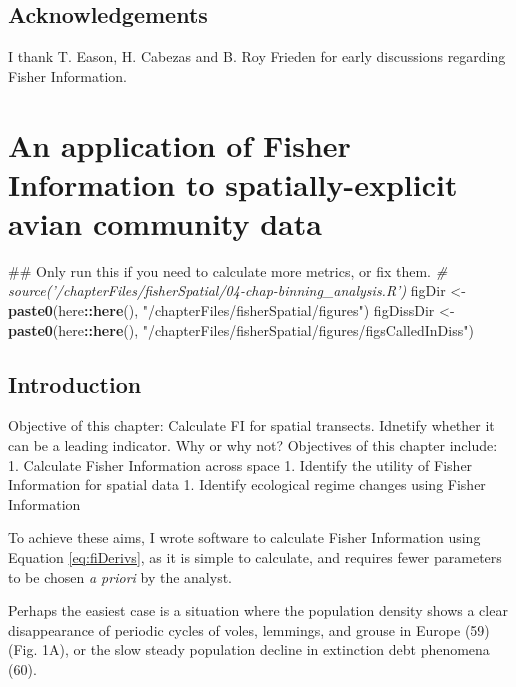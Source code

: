 \documentclass[12pt,twoside,openany]{reedthesis}
\newenvironment{Shaded}{\begin{snugshade}}{\end{snugshade}}
\newcommand{\KeywordTok}[1]{\textcolor[rgb]{0.13,0.29,0.53}{\textbf{#1}}}
\newcommand{\StringTok}[1]{\textcolor[rgb]{0.31,0.60,0.02}{#1}}
\newcommand{\CommentTok}[1]{\textcolor[rgb]{0.56,0.35,0.01}{\textit{#1}}}
\newcommand{\OperatorTok}[1]{\textcolor[rgb]{0.81,0.36,0.00}{\textbf{#1}}}
\newcommand{\NormalTok}[1]{#1}
\begin{document}
\section{Acknowledgements}\label{acknowledgements}

I thank T. Eason, H. Cabezas and B. Roy Frieden for early discussions
regarding Fisher Information.

\chapter{An application of Fisher Information to spatially-explicit
avian community data}\label{fisherSpatial-chapter}
\begin{Shaded}
\begin{Highlighting}[]
\NormalTok{## Only run this if you need to calculate more metrics, or fix them.}
\CommentTok{# source('/chapterFiles/fisherSpatial/04-chap-binning_analysis.R')}
\NormalTok{figDir <-}\StringTok{ }\KeywordTok{paste0}\NormalTok{(here}\OperatorTok{::}\KeywordTok{here}\NormalTok{(), }\StringTok{"/chapterFiles/fisherSpatial/figures"}\NormalTok{)}
\NormalTok{figDissDir <-}\StringTok{ }\KeywordTok{paste0}\NormalTok{(here}\OperatorTok{::}\KeywordTok{here}\NormalTok{(), }\StringTok{"/chapterFiles/fisherSpatial/figures/figsCalledInDiss"}\NormalTok{)}
\end{Highlighting}
\end{Shaded}
\section{Introduction}\label{introduction-2}

Objective of this chapter: Calculate FI for spatial transects. Idnetify
whether it can be a leading indicator. Why or why not? Objectives of
this chapter include: 1. Calculate Fisher Information across space 1.
Identify the utility of Fisher Information for spatial data 1. Identify
ecological regime changes using Fisher Information

To achieve these aims, I wrote software to calculate Fisher Information
using Equation \eqref{eq:fiDerivs}, as it is simple to calculate, and
requires fewer parameters to be chosen \emph{a priori} by the analyst.

Perhaps the easiest case is a situation where the population density
shows a clear disappearance of periodic cycles of voles, lemmings, and
grouse in Europe (59) (Fig. 1A), or the slow steady population decline
in extinction debt phenomena (60).
\end{document}
